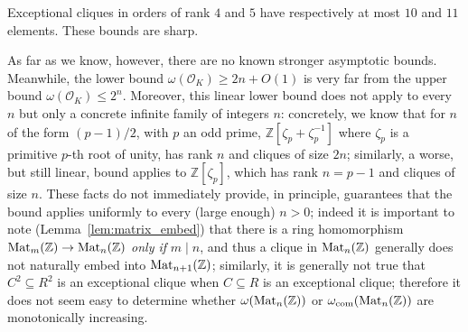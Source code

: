 \documentclass{amsart}
\theoremstyle{plain}
\newenvironment{maintheorem}[1]
  {\renewcommand\theinnermaintheorem{\ref{#1}}\innermaintheorem}
  {\endinnermaintheorem}
\theoremstyle{definition}
\newcommand{\Z}{\ensuremath{\mathbb{Z}}}
\newcommand{\inote}[1]{\textbf{\color{red}Ignacio: #1}}
\begin{document}
\begin{maintheorem}{thm:computational_commutative}
	Exceptional cliques in orders of rank \(4\) and \(5\) have respectively at most \(10\) and \(11\) elements. These bounds are sharp.
\end{maintheorem}

As far as we know, however, there are no known stronger asymptotic bounds. Meanwhile, the lower bound $\omega(\mathcal{O}_K)\geq 2n+O(1)$ is very far from the upper bound $\omega(\mathcal{O}_K)\leq 2^n$. Moreover, this linear lower bound does not apply to every $n$ but only a concrete infinite family of integers $n$: concretely, we know that for $n$ of the form $(p-1)/2$, with $p$ an odd prime, $\Z[\zeta_p+\zeta_p^{-1}]$ where $\zeta_p$ is a primitive $p$-th root of unity, has rank $n$ and cliques of size $2n$; similarly, a worse, but still linear, bound applies to $\Z[\zeta_p]$, which has rank $n=p-1$ and cliques of size $n$. These facts do not immediately provide, in principle, guarantees that the bound applies uniformly to every (large enough) $n>0$; indeed it is important to note (Lemma~\ref{lem:matrix_embed}) that there is a ring homomorphism \(\textup{Mat}_m(\Z)\to\textup{Mat}_n(\Z)\) \emph{only if} \(m\mid n\), and thus a clique in \(\textup{Mat}_n(\Z)\) generally does not naturally embed into \(\textup{Mat}_{n+1}(\Z)\); similarly, it is generally not true that \(C^2\subseteq R^2\) is an exceptional clique when \(C\subseteq R\) is an exceptional clique; therefore it does not seem easy to determine whether \(\omega(\textup{Mat}_n(\Z))\) or $\omega_{\textup{com}}(\textup{Mat}_n(\Z))$ are monotonically increasing.





\end{document}
